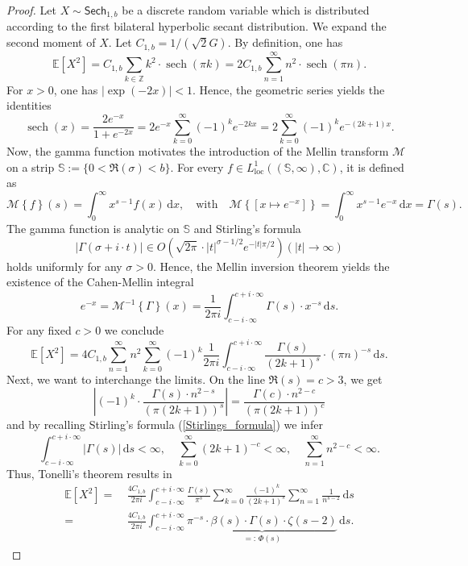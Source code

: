\documentclass[12pt]{amsart}
\theoremstyle{definition}
\theoremstyle{remark}
\numberwithin{equation}{section}
\newcommand{\1}{\mathbbm{1}}
\begin{document}
{\begin{proof}
Let $X\sim\mathsf{Sech}_{1,b}$ be a discrete random variable which is distributed according to the first bilateral hyperbolic secant distribution. We expand the second moment of $X$. Let $C_{1,b} = 1/(\sqrt{2}G)$. By definition, one has
$$
\mathbb{E}\left[X^2\right] = C_{1,b} \sum_{k \in \mathbb{Z}} k^2\cdot \operatorname{sech}\left(\pi k\right) = 2C_{1,b} \sum_{n=1}^\infty n^2 \cdot \operatorname{sech}(\pi n).
$$
For $x > 0$, one has $|\exp(-2x)| < 1$. Hence, the geometric series yields the identities
$$
\operatorname{sech}(x) = \frac{2e^{-x}}{1+e^{-2x}} = 2e^{-x} \sum_{k=0}^\infty (-1)^k e^{-2kx} = 2 \sum_{k=0}^\infty (-1)^k e^{-(2k+1)x}.
$$
Now, the gamma function motivates the introduction of the Mellin transform $\mathcal{M}$ on a strip $\mathbb{S} := \{0 < \Re(\sigma) < b\}$. For every $f \in L^1_{\mathrm{loc}}((\mathbb{S},\infty), \mathbb{C})$, it is defined as
$$
\mathcal{M}\left\{f\right\}(s) = \int_0^\infty x^{s-1} f(x) \, \mathrm{d}x, \quad \mathrm{with} \quad \mathcal{M}\left\{\left[x \mapsto e^{-x}\right]\right\} = \int_0^\infty x^{s-1}e^{-x} \, \mathrm{d}x = \Gamma(s).
$$
The gamma function is analytic on $\mathbb{S}$ and Stirling's formula
\begin{equation}\label{Stirlings_formula}
|\Gamma(\sigma + i \cdot t)| \in O\left(\sqrt{2\pi} \cdot |t|^{\sigma-1/2} e^{-|t| \pi/2}\right) (|t| \rightarrow \infty)
\end{equation}
holds uniformly for any $\sigma > 0$. Hence, the Mellin inversion theorem yields the existence of the Cahen-Mellin integral
$$
e^{-x} = \mathcal{M}^{-1}\left\{\Gamma\right\}(x) = \frac{1}{2\pi i} \int_{c-i \cdot\infty}^{c+i \cdot\infty} \Gamma(s) \cdot x^{-s} \, \mathrm{d}s.
$$
For any fixed $c>0$ we conclude
$$
\mathbb{E}\left[X^2\right] = 4C_{1,b} \sum_{n=1}^\infty n^2 \sum_{k=0}^\infty (-1)^k \frac{1}{2\pi i} \int_{c-i \cdot\infty}^{c+i \cdot\infty} \frac{\Gamma(s)}{(2k+1)^{s}} \cdot (\pi n)^{-s}\, \mathrm{d}s.
$$
Next, we want to interchange the limits. On the line $\Re(s)=c>3$, we get
$$
\left|(-1)^k \cdot \frac{\Gamma(s)\cdot n^{2-s}}{(\pi (2k+1))^{s}}\right| = \frac{\Gamma(c)\cdot n^{2-c}}{\left(\pi (2k+1)\right)^{c}}
$$
and by recalling Stirling's formula (\ref{Stirlings_formula}) we infer
$$
\int_{c-i \cdot\infty}^{c+i \cdot\infty} |\Gamma(s)|\, \mathrm{d}s < \infty, \quad \sum_{k=0}^\infty (2k+1)^{-c} < \infty, \quad \sum_{n=1}^\infty n^{2-c} < \infty.
$$
Thus, Tonelli's theorem results in
\begin{align*}
\mathbb{E}\left[X^2\right] =&\ \frac{4C_{1,b}}{2\pi i} \int_{c-i \cdot\infty}^{c+i \cdot\infty} \frac{\Gamma(s)}{\pi^s} \sum_{k=0}^\infty \frac{(-1)^k}{(2k+1)^{s}} \sum_{n=1}^\infty \frac{1}{n^{s-2}}\, \mathrm{d}s \\
=&\ \frac{4C_{1,b}}{2\pi i} \int_{c-i \cdot\infty}^{c+i \cdot\infty} \underbrace{\pi^{-s} \cdot \beta(s) \cdot \Gamma(s) \cdot \zeta(s - 2)}_{=:\, \Phi(s)} \, \mathrm{d}s.
\end{align*}


\end{proof}}
\end{document}

